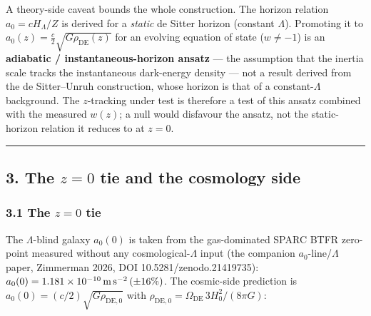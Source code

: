 \documentclass[
]{article}
\begin{document}
A theory-side caveat bounds the whole construction. The horizon relation
\(a_0=cH_\Lambda/Z\) is derived for a \emph{static} de Sitter horizon
(constant \(\Lambda\)). Promoting it to
\(a_0(z)=\tfrac{c}{2}\sqrt{G\rho_\mathrm{DE}(z)}\) for an evolving equation
of state (\(w\ne-1\)) is an \textbf{adiabatic / instantaneous-horizon
ansatz} --- the assumption that the inertia scale tracks the
instantaneous dark-energy density --- not a result derived from the de
Sitter--Unruh construction, whose horizon is that of a
constant-\(\Lambda\) background. The \(z\)-tracking under test is
therefore a test of this ansatz combined with the measured \(w(z)\); a
null would disfavour the ansatz, not the static-horizon relation it
reduces to at \(z=0\).

\begin{center}\rule{0.5\linewidth}{0.5pt}\end{center}

\subsection{\texorpdfstring{3. The \(z=0\) tie and the cosmology
side}{3. The z=0 tie and the cosmology side}}\label{the-z0-tie-and-the-cosmology-side}

\subsubsection{\texorpdfstring{3.1 The \(z=0\)
tie}{3.1 The z=0 tie}}\label{the-z0-tie}

The \(\Lambda\)-blind galaxy \(a_0(0)\) is taken from the gas-dominated
SPARC BTFR zero-point measured without any cosmological-\(\Lambda\)
input (the companion \(a_0\)-line/\(\Lambda\) paper, Zimmerman 2026, DOI
10.5281/zenodo.21419735):
\(a_0(0)=1.181\times10^{-10}\,{\rm m\,s^{-2}}\,(\pm16\%)\). The
cosmic-side prediction is \(a_0(0)=(c/2)\sqrt{G\rho_\mathrm{DE,0}}\) with
\(\rho_\mathrm{DE,0}=\Omega_\mathrm{DE}\,3H_0^2/(8\pi G)\):
\end{document}
